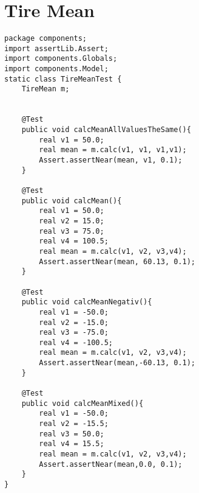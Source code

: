 \section{Tire Mean}
\begin{lstlisting}
package components;
import assertLib.Assert;
import components.Globals;
import components.Model;
static class TireMeanTest {
	TireMean m;
	
	
	@Test
	public void calcMeanAllValuesTheSame(){
		real v1 = 50.0;
		real mean = m.calc(v1, v1, v1,v1);
		Assert.assertNear(mean, v1, 0.1);
	}
	
	@Test
	public void calcMean(){
		real v1 = 50.0;
		real v2 = 15.0;
		real v3 = 75.0;
		real v4 = 100.5;
		real mean = m.calc(v1, v2, v3,v4);
		Assert.assertNear(mean, 60.13, 0.1);
	}
	
	@Test
	public void calcMeanNegativ(){
		real v1 = -50.0;
		real v2 = -15.0;
		real v3 = -75.0;
		real v4 = -100.5;
		real mean = m.calc(v1, v2, v3,v4);
		Assert.assertNear(mean,-60.13, 0.1);
	}
	
	@Test
	public void calcMeanMixed(){
		real v1 = -50.0;
		real v2 = -15.5;
		real v3 = 50.0;
		real v4 = 15.5;
		real mean = m.calc(v1, v2, v3,v4);
		Assert.assertNear(mean,0.0, 0.1);
	}
}
\end{lstlisting}